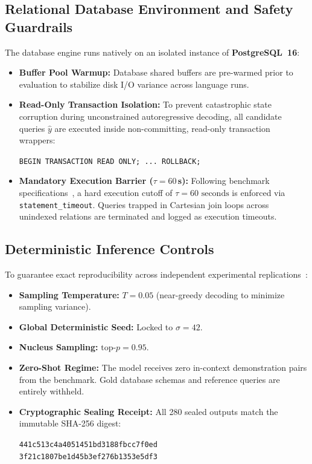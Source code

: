 \documentclass[conference]{IEEEtran}
\begin{document}
\subsection{Relational Database Environment and Safety Guardrails}
The database engine runs natively on an isolated instance of \textbf{PostgreSQL~16}:
\begin{itemize}
    \item \textbf{Buffer Pool Warmup:} Database shared buffers are pre-warmed prior to evaluation to stabilize disk I/O variance across language runs.
    \item \textbf{Read-Only Transaction Isolation:} To prevent catastrophic state corruption during unconstrained autoregressive decoding, all candidate queries $\hat{y}$ are executed inside non-committing, read-only transaction wrappers:
    \begin{center}
    \texttt{BEGIN TRANSACTION READ ONLY; ... ROLLBACK;}
    \end{center}
    \item \textbf{Mandatory Execution Barrier ($\tau = 60$\,s):} Following benchmark specifications~\cite{dawar2026indicdbbench}, a hard execution cutoff of $\tau = 60\text{ seconds}$ is enforced via \texttt{statement\_timeout}. Queries trapped in Cartesian join loops across unindexed relations are terminated and logged as execution timeouts.
\end{itemize}

\subsection{Deterministic Inference Controls}
To guarantee exact reproducibility across independent experimental replications~\cite{gao2023gpt4}:
\begin{itemize}
    \item \textbf{Sampling Temperature:} $T = 0.05$ (near-greedy decoding to minimize sampling variance).
    \item \textbf{Global Deterministic Seed:} Locked to $\sigma = 42$.
    \item \textbf{Nucleus Sampling:} $\text{top-}p = 0.95$.
    \item \textbf{Zero-Shot Regime:} The model receives zero in-context demonstration pairs from the benchmark. Gold database schemas and reference queries are entirely withheld.
    \item \textbf{Cryptographic Sealing Receipt:} All 280 sealed outputs match the immutable SHA-256 digest:
    \begin{center}
    \footnotesize\texttt{441c513c4a4051451bd3188fbcc7f0ed}\\
    \footnotesize\texttt{3f21c1807be1d45b3ef276b1353e5df3}
    \end{center}
\end{itemize}
\end{document}
